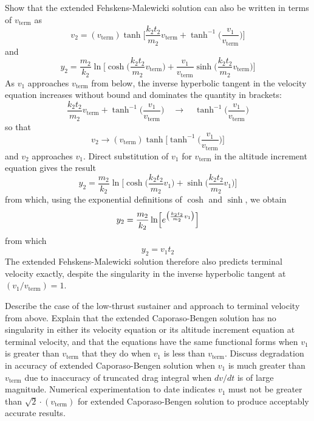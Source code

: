 Show that the extended Fehskens-Malewicki solution can also be written in terms of $v_{\mathrm{term}}$ as
\begin{equation*}
v_2 = (v_{\mathrm{term}})\tanh\biggl[\frac{k_2t_2}{m_2}v_{\mathrm{term}}
  + \tanh^{-1}\biggl(\frac{v_1}{v_{\mathrm{term}}}\biggr)\biggr]
\end{equation*}
and
\begin{equation*}
y_2 = \frac{m_2}{k_2}\ln\biggl[\cosh\biggl(\frac{k_2t_2}{m_2}v_{\mathrm{term}}\biggr)
  + \frac{v_1}{v_{\mathrm{term}}}\sinh\biggl(\frac{k_2t_2}{m_2}v_{\mathrm{term}}\biggr)\biggr]
\end{equation*}
As $v_1$ approaches $v_{\mathrm{term}}$ from below, the inverse hyperbolic tangent in the velocity equation
increases without bound and dominates the quantity in brackets:
\begin{equation*}
\frac{k_2t_2}{m_2}v_{\mathrm{term}} + \tanh^{-1}\biggl(\frac{v_1}{v_{\mathrm{term}}}\biggr)
  \quad\longrightarrow\quad \tanh^{-1}\biggl(\frac{v_1}{v_{\mathrm{term}}}\biggr)
\end{equation*}
so that
\begin{equation*}
v_2 \longrightarrow (v_{\mathrm{term}})\tanh\biggl[\tanh^{-1}\biggl(\frac{v_1}{v_{\mathrm{term}}}\biggr)\biggr]
\end{equation*}
and $v_2$ approaches $v_1$. Direct substitution of $v_1$ for $v_{\mathrm{term}}$ in the altitude increment
equation gives the result
\begin{equation*}
y_2 = \frac{m_2}{k_2}\ln\biggl[\cosh\biggl(\frac{k_2t_2}{m_2}v_1\biggr)
  + \sinh\biggl(\frac{k_2t_2}{m_2}v_1\biggr)\biggr]
\end{equation*}
from which, using the exponential definitions of $\cosh$ and $\sinh$, we obtain
\begin{equation*}
y_2 = \frac{m_2}{k_2}\ln\Bigl[e^{\bigl(\frac{k_2t_2}{m_2}v_1\bigr)}\Bigr]
\end{equation*}
from which
\begin{equation*}
y_2 = v_1t_2
\end{equation*}
The extended Fehskens-Malewicki solution therefore also predicts terminal velocity exactly, despite the
singularity in the inverse hyperbolic tangent at $(v_1/v_{\mathrm{term}}) = 1$.

Describe the case of the low-thrust sustainer and approach to terminal velocity from above. Explain that the
extended Caporaso-Bengen solution has no singularity in either its velocity equation or its altitude
increment equation at terminal velocity, and that the equations have the same functional forms when $v_1$ is
greater than $v_{\mathrm{term}}$ that they do when $v_1$ is less than $v_{\mathrm{term}}$. Discuss
degradation in accuracy of extended Caporaso-Bengen solution when $v_1$ is much greater than
$v_{\mathrm{term}}$ due to inaccuracy of truncated drag integral when $dv/dt$ is of large magnitude.
Numerical experimentation to date indicates $v_1$ must not be greater than $\sqrt{2}\cdot(v_{\mathrm{term}})$
for extended Caporaso-Bengen solution to produce acceptably accurate results.

